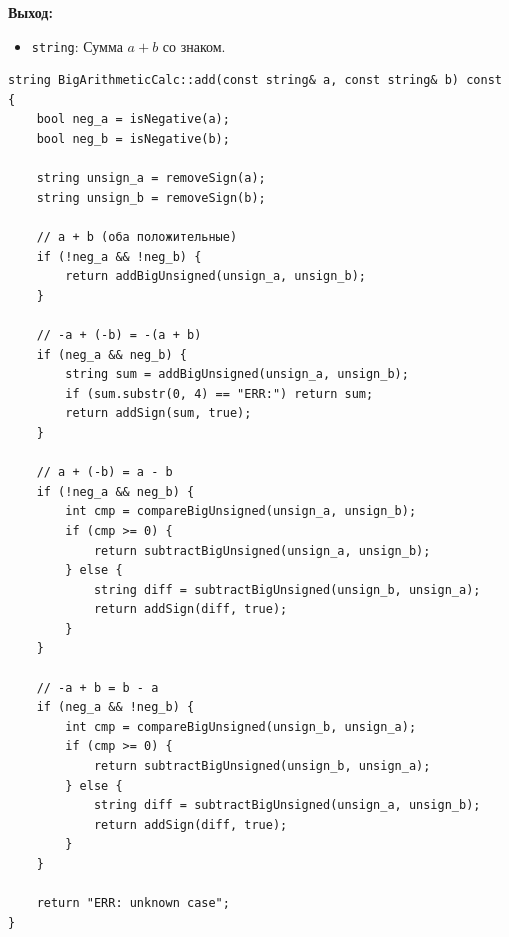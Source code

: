 \textbf{Выход:}
\begin{itemize}
    \item \texttt{string}: Сумма $a + b$ со знаком.
\end{itemize}

\begin{lstlisting}[style=cstyle, caption={Реализация add()}]
string BigArithmeticCalc::add(const string& a, const string& b) const {
    bool neg_a = isNegative(a);
    bool neg_b = isNegative(b);
    
    string unsign_a = removeSign(a);
    string unsign_b = removeSign(b);
    
    // a + b (оба положительные)
    if (!neg_a && !neg_b) {
        return addBigUnsigned(unsign_a, unsign_b);
    }
    
    // -a + (-b) = -(a + b)
    if (neg_a && neg_b) {
        string sum = addBigUnsigned(unsign_a, unsign_b);
        if (sum.substr(0, 4) == "ERR:") return sum;
        return addSign(sum, true);
    }
    
    // a + (-b) = a - b
    if (!neg_a && neg_b) {
        int cmp = compareBigUnsigned(unsign_a, unsign_b);
        if (cmp >= 0) {
            return subtractBigUnsigned(unsign_a, unsign_b);
        } else {
            string diff = subtractBigUnsigned(unsign_b, unsign_a);
            return addSign(diff, true);
        }
    }
    
    // -a + b = b - a
    if (neg_a && !neg_b) {
        int cmp = compareBigUnsigned(unsign_b, unsign_a);
        if (cmp >= 0) {
            return subtractBigUnsigned(unsign_b, unsign_a);
        } else {
            string diff = subtractBigUnsigned(unsign_a, unsign_b);
            return addSign(diff, true);
        }
    }
    
    return "ERR: unknown case";
}
\end{lstlisting}





